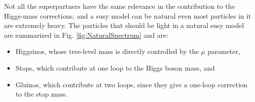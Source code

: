 Not all the superpartners have the same relevance in the contribution to the Higgs-mass corrections, and a \gls{susy} model can be natural even most particles in it are extremely heavy. The particles that should be light in a natural \gls{susy} model are summarized in Fig. \ref{fig:NaturalSpectrum} and are:
\begin{itemize}
\item Higgsinos, whose tree-level mass is directly controlled by the $\mu$ parameter,
\item Stops, which contribute at one loop to the Higgs boson mass, and
\item Gluinos, which contribute at two loops, since they give a one-loop correction to the stop mass.
\end{itemize}





